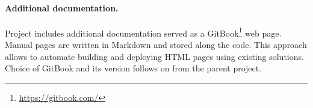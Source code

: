 \paragraph{Additional documentation.}
Project includes additional documentation served as a GitBook\footnote{\href{https://gitbook.com/}{https://gitbook.com/}} web page.
Manual pages are written in Markdown and stored along the code.
This approach allows to automate building and deploying HTML pages using existing solutions.
Choice of GitBook and its version follows on from the parent project.
